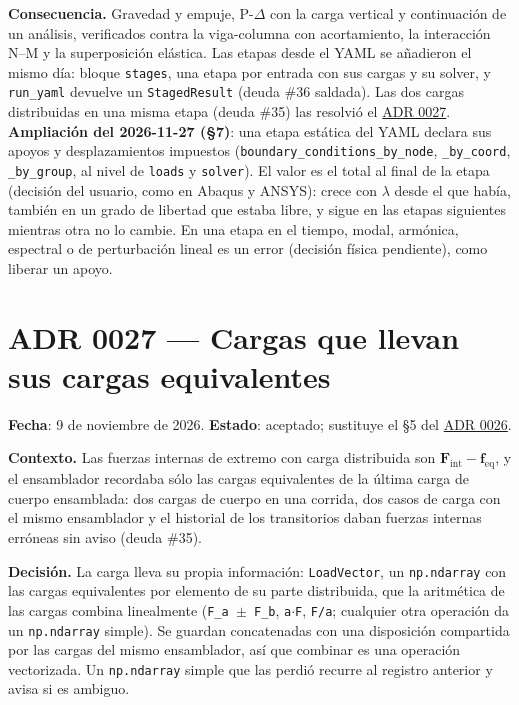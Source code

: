 \documentclass[11pt,oneside]{report}
\begin{document}
\textbf{Consecuencia.} Gravedad y empuje, P-\ensuremath{\Delta} con la carga vertical y continuación de un análisis, verificados contra la viga-columna con acortamiento, la interacción N--M y la superposición elástica. Las etapas desde el YAML se añadieron el mismo día: bloque \texttt{stages}, una etapa por entrada con sus cargas y su solver, y \texttt{run\_yaml} devuelve un \texttt{StagedResult} (deuda \#36 saldada). Las dos cargas distribuidas en una misma etapa (deuda \#35) las resolvió el \hyperref[adr:0027]{ADR 0027}. \textbf{Ampliación del 2026-11-27 (§7)}: una etapa estática del YAML declara sus apoyos y desplazamientos impuestos (\texttt{boundary\_\allowbreak{}conditions\_\allowbreak{}by\_\allowbreak{}node}, \texttt{\_by\_coord}, \texttt{\_by\_group}, al nivel de \texttt{loads} y \texttt{solver}). El valor es el total al final de la etapa (decisión del usuario, como en Abaqus y ANSYS): crece con \ensuremath{\lambda} desde el que había, también en un grado de libertad que estaba libre, y sigue en las etapas siguientes mientras otra no lo cambie. En una etapa en el tiempo, modal, armónica, espectral o de perturbación lineal es un error (decisión física pendiente), como liberar un apoyo.

\section{ADR 0027 --- Cargas que llevan sus cargas equivalentes}
\label{adr:0027}

\textbf{Fecha}: 9 de noviembre de 2026. \textbf{Estado}: aceptado; sustituye el §5 del \hyperref[adr:0026]{ADR 0026}.

\textbf{Contexto.} Las fuerzas internas de extremo con carga distribuida son $\mathbf F_\text{int} - \mathbf f_\text{eq}$, y el ensamblador recordaba sólo las cargas equivalentes de la última carga de cuerpo ensamblada: dos cargas de cuerpo en una corrida, dos casos de carga con el mismo ensamblador y el historial de los transitorios daban fuerzas internas erróneas sin aviso (deuda \#35).

\textbf{Decisión.} La carga lleva su propia información: \texttt{LoadVector}, un \texttt{np.ndarray} con las cargas equivalentes por elemento de su parte distribuida, que la aritmética de las cargas combina linealmente (\texttt{F\_a \ensuremath{\pm} F\_b}, \texttt{a\ensuremath{\cdot}F}, \texttt{F/a}; cualquier otra operación da un \texttt{np.ndarray} simple). Se guardan concatenadas con una disposición compartida por las cargas del mismo ensamblador, así que combinar es una operación vectorizada. Un \texttt{np.ndarray} simple que las perdió recurre al registro anterior y avisa si es ambiguo.
\end{document}
